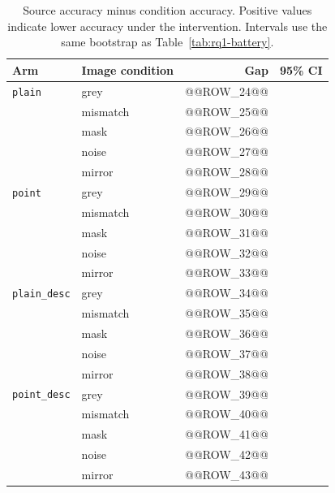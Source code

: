 \begin{table}[ht]
\centering
\caption[Stage~1 gaps relative to source]{Source accuracy minus condition
accuracy. Positive values indicate lower accuracy under the intervention.
Intervals use the same bootstrap as Table~\ref{tab:rq1-battery}.}
\label{tab:rq1-gaps}
\begin{tabular}{llrr}
\toprule
Arm & Image condition & Gap & 95\% CI \\
\midrule
\texttt{plain} & grey & @@ROW_24@@ \\
 & mismatch & @@ROW_25@@ \\
 & mask & @@ROW_26@@ \\
 & noise & @@ROW_27@@ \\
 & mirror & @@ROW_28@@ \\
\texttt{point} & grey & @@ROW_29@@ \\
 & mismatch & @@ROW_30@@ \\
 & mask & @@ROW_31@@ \\
 & noise & @@ROW_32@@ \\
 & mirror & @@ROW_33@@ \\
\texttt{plain\_desc} & grey & @@ROW_34@@ \\
 & mismatch & @@ROW_35@@ \\
 & mask & @@ROW_36@@ \\
 & noise & @@ROW_37@@ \\
 & mirror & @@ROW_38@@ \\
\texttt{point\_desc} & grey & @@ROW_39@@ \\
 & mismatch & @@ROW_40@@ \\
 & mask & @@ROW_41@@ \\
 & noise & @@ROW_42@@ \\
 & mirror & @@ROW_43@@ \\
\bottomrule
\end{tabular}
\end{table}
